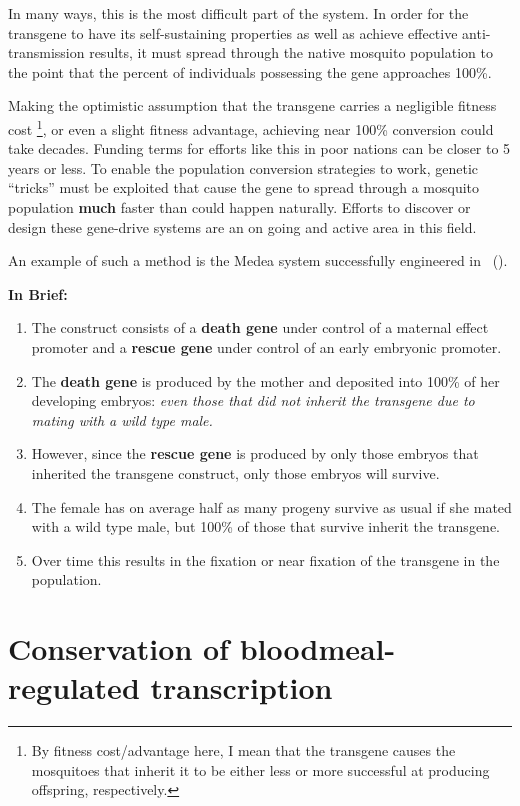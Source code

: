 In many ways, this is the most difficult part of the system.
In order for the transgene to have its self-sustaining properties as well as achieve effective anti-transmission results, it must spread through the native mosquito population to the point that the percent of individuals possessing the gene approaches 100\%.

Making the optimistic assumption that the transgene carries a negligible fitness cost
\footnote{By fitness cost/advantage here, I mean that the transgene
    causes the mosquitoes that inherit it to be either less or more
    successful at producing offspring, respectively.},
or even a slight fitness advantage, achieving near 100\% conversion could take decades.
Funding terms for efforts like this in poor nations can be closer to 5 years or less.
To enable the population conversion strategies to work, genetic ``tricks'' must be exploited that cause the gene to spread through a mosquito population \textbf{much} faster than could happen naturally.
Efforts to discover or design these \gls{gene-drive} systems are an on going and active area in this field.

An example of such a method is the Medea system successfully engineered in \Dm\ (\CITEME).

\textbf{In Brief:}
\begin{enumerate}
 \item The construct consists of a \textbf{death gene} under control of a maternal effect promoter and a \textbf{rescue gene} under control of an early embryonic promoter.
 \item The \textbf{death gene} is produced by the mother and deposited into 100\% of her developing embryos: \textit{even those that did not inherit the transgene due to mating with a wild type male.}
 \item However, since the \textbf{rescue gene} is produced by only those embryos that inherited the transgene construct, only those embryos will survive.
 \item The female has on average half as many progeny survive as usual if she mated with a wild type male, but 100\% of those that survive inherit the transgene.
 \item Over time this results in the fixation or near fixation of the transgene in the population.
\end{enumerate}


\section{Conservation of bloodmeal-regulated transcription}
\dummytext[3]

